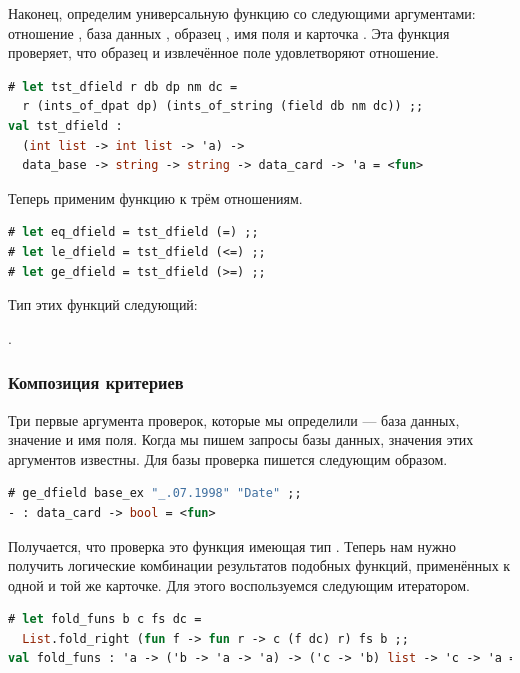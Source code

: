 Наконец, определим универсальную функцию  со следующими 
аргументами: отношение , база данных , образец , имя 
поля  и карточка . Эта функция проверяет, что образец и 
извлечённое поле удовлетворяют отношение.

\begin{lstlisting}[language=OCaml]
# let tst_dfield r db dp nm dc = 
  r (ints_of_dpat dp) (ints_of_string (field db nm dc)) ;;
val tst_dfield :
  (int list -> int list -> 'a) ->
  data_base -> string -> string -> data_card -> 'a = <fun>
\end{lstlisting}

Теперь применим функцию к трём отношениям.

\begin{lstlisting}[language=OCaml]
# let eq_dfield = tst_dfield (=) ;;
# let le_dfield = tst_dfield (<=) ;;
# let ge_dfield = tst_dfield (>=) ;;
\end{lstlisting}

Тип этих функций следующий:

.

\subsubsection{Композиция критериев}

Три первые аргумента проверок, которые мы определили --- база данных, значение 
и имя поля. Когда мы пишем запросы базы данных, значения этих аргументов 
известны. Для базы  проверка  пишется 
следующим образом.

\begin{lstlisting}[language=OCaml]
# ge_dfield base_ex "_.07.1998" "Date" ;;
- : data_card -> bool = <fun>
\end{lstlisting}

Получается, что проверка это функция имеющая тип . 
Теперь нам нужно получить логические комбинации результатов подобных функций, 
применённых к одной и той же карточке. Для этого воспользуемся следующим 
итератором.

\begin{lstlisting}[language=OCaml]
# let fold_funs b c fs dc =
  List.fold_right (fun f -> fun r -> c (f dc) r) fs b ;;
val fold_funs : 'a -> ('b -> 'a -> 'a) -> ('c -> 'b) list -> 'c -> 'a = <fun>
\end{lstlisting}

